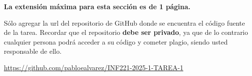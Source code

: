 \begin{mdframed}
    \textbf{La extensión máxima para esta sección es de 1 página.}
\end{mdframed}


Sólo agregar la url del repositorio de GitHub donde se encuentra el código fuente de la tarea. Recordar que el repositorio \textbf{debe ser privado}, ya que de lo contrario cualquier persona podrá acceder a su código y cometer plagio, siendo usted responsable de ello. 

\begin{mdframed}
    \begin{center}
        {\Large \url{https://github.com/pabloealvarez/INF221-2025-1-TAREA-1}}
    \end{center}
\end{mdframed}


